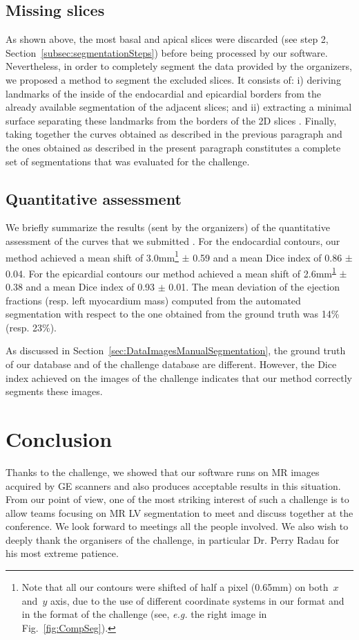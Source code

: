 \documentclass{llncs}
\newcommand{\eg}[0]{{\em e.g.}\xspace}
\begin{document}
\subsection{Missing slices}
As shown above, the most basal and apical slices were
discarded (see step 2, Section~\ref{subsec:segmentationSteps}) before
being processed by our software. Nevertheless, in order to completely
segment the data provided by the organizers, we proposed a method to
segment the excluded slices. It consists of: i) deriving landmarks of
the inside of the endocardial and epicardial borders from the already
available segmentation of the adjacent slices; and ii) extracting a
minimal surface separating these landmarks from the borders of the 2D
slices \cite{AT06}. Finally, taking together the curves obtained as
described in the previous paragraph and the ones obtained as described
in the present paragraph constitutes a complete set of segmentations
that was evaluated for the challenge.
%
\subsection{Quantitative assessment}
We briefly summarize the results (sent by the organizers) of the
quantitative assessment of the curves that we submitted . For the
endocardial contours, our method achieved a mean shift of
3.0mm\footnote{\label{fn:1}Note that all our contours were shifted of
  half a pixel (0.65mm) on both~$x$ and~$y$ axis, due to the use of
  different coordinate systems in our format and in the format of the
  challenge (see, \eg the right image in Fig.~\ref{fig:CompSeg}).}
$\pm$ 0.59 and a mean Dice index of 0.86 $\pm$ 0.04. For the
epicardial contours our method achieved a mean shift of
2.6mm\textsuperscript{\ref{fn:1}} $\pm$ 0.38 and a mean Dice index of
0.93 $\pm$ 0.01. The mean deviation of the ejection fractions
(resp. left myocardium mass) computed from the automated segmentation
with respect to the one obtained from the ground truth was 14\%
(resp. 23\%).

As discussed in Section~\ref{sec:DataImagesManualSegmentation}, the
ground truth of our database and of the challenge database are
different. However, the Dice index achieved on the images of the
challenge indicates that our method correctly segments these images.
%
\section{Conclusion}
Thanks to the challenge, we showed that our software runs on MR images
acquired by GE scanners and also produces acceptable results in this situation. 
From our point of view, one of the most striking interest of
such a challenge is to allow teams focusing on MR LV segmentation to
meet and discuss together at the conference. We look forward to
meetings all the people involved. We also wish to deeply thank the organisers
of the challenge, in particular Dr. Perry Radau for his most extreme patience.
\end{document}
